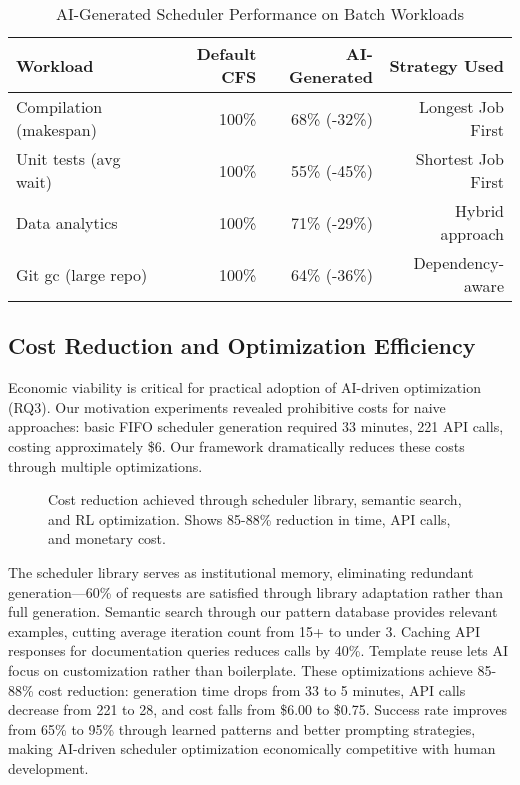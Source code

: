 \begin{table}[h]
\caption{AI-Generated Scheduler Performance on Batch Workloads}
\label{tab:batch-results}
\begin{tabular}{lrrr}
\toprule
Workload & Default CFS & AI-Generated & Strategy Used \\
\midrule
Compilation (makespan) & 100\% & 68\% (-32\%) & Longest Job First \\
Unit tests (avg wait) & 100\% & 55\% (-45\%) & Shortest Job First \\
Data analytics & 100\% & 71\% (-29\%) & Hybrid approach \\
Git gc (large repo) & 100\% & 64\% (-36\%) & Dependency-aware \\
\bottomrule
\end{tabular}
\end{table}

\subsection{Cost Reduction and Optimization Efficiency}

Economic viability is critical for practical adoption of AI-driven optimization (RQ3). Our motivation experiments revealed prohibitive costs for naive approaches: basic FIFO scheduler generation required 33 minutes, 221 API calls, costing approximately \$6. Our framework dramatically reduces these costs through multiple optimizations.

\begin{figure}[h]
\centering
{}
\caption{Cost reduction achieved through scheduler library, semantic search, and RL optimization. Shows 85-88\% reduction in time, API calls, and monetary cost.}
\label{fig:cost-reduction}
\end{figure}

The scheduler library serves as institutional memory, eliminating redundant generation—60\% of requests are satisfied through library adaptation rather than full generation. Semantic search through our pattern database provides relevant examples, cutting average iteration count from 15+ to under 3. Caching API responses for documentation queries reduces calls by 40\%. Template reuse lets AI focus on customization rather than boilerplate. These optimizations achieve 85-88\% cost reduction: generation time drops from 33 to 5 minutes, API calls decrease from 221 to 28, and cost falls from \$6.00 to \$0.75. Success rate improves from 65\% to 95\% through learned patterns and better prompting strategies, making AI-driven scheduler optimization economically competitive with human development.

